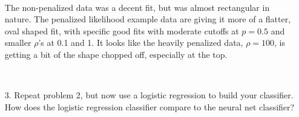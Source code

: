 \documentclass[]{article}
\begin{document}
~

\begin{itemize} \item[] The non-penalized data was a decent fit, but was almost rectangular in nature. The penalized likelihood example data are giving it more of a flatter, oval shaped fit, with specific good fits with moderate cutoffs at $p=0.5$ and smaller $\rho$'s at 0.1 and 1. It looks like the heavily penalized data, $\rho = 100$, is getting a bit of the shape chopped off, especially at the top.
 \end{itemize}

\vspace{2 cm}

~

\begin{itemize} \item[3.] Repeat problem 2,  but now use a logistic regression to build your classifier.  How does the logistic regression classifier compare to the neural net classifier?  
 \end{itemize}

~
\end{document}
